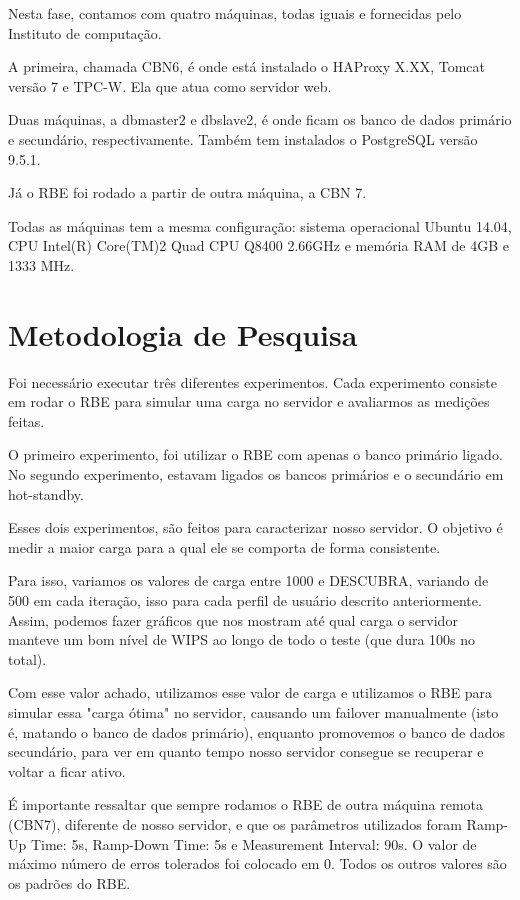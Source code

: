 \documentclass[11pt,twoside]{article}
\begin{document}
     Nesta fase, contamos com quatro máquinas, todas iguais e fornecidas pelo Instituto de computação.

     A primeira, chamada CBN6, é onde está instalado o HAProxy X.XX, Tomcat versão 7 e TPC-W. Ela que atua como servidor web.

     Duas máquinas, a dbmaster2 e dbslave2, é onde ficam os banco de dados primário e secundário, respectivamente. Também tem instalados o PostgreSQL vers\~ao 9.5.1.

     Já o RBE foi rodado a partir de outra máquina, a CBN 7.

     Todas as máquinas tem a mesma configuração: sistema operacional Ubuntu 14.04, CPU Intel(R) Core(TM)2 Quad CPU Q8400 2.66GHz e mem\'oria RAM de 4GB e 1333 MHz.

\section{Metodologia de Pesquisa}
\setlength{\parindent}{4ex}
Foi necessário executar três diferentes experimentos. Cada experimento consiste em rodar o RBE para simular uma carga no servidor e avaliarmos as medições feitas.

O primeiro experimento, foi utilizar o RBE com apenas o banco primário ligado. No segundo experimento, estavam ligados os bancos primários e o secundário em hot-standby.

Esses dois experimentos, são feitos para caracterizar nosso servidor. O objetivo é medir a maior carga para a qual ele se comporta de forma consistente.

Para isso, variamos os valores de carga entre 1000 e DESCUBRA, variando de 500 em cada iteração, isso para cada perfil de usuário descrito anteriormente. Assim, podemos fazer gráficos que nos mostram até qual carga o servidor manteve um bom nível de WIPS ao longo de todo o teste (que dura 100s no total).

Com esse valor achado, utilizamos esse valor de carga e utilizamos o RBE para simular essa "carga ótima" no servidor, causando um failover  manualmente (isto é, matando o banco de dados primário), enquanto promovemos o banco de dados secundário, para ver em quanto tempo nosso servidor consegue se recuperar e voltar a ficar ativo.

É importante ressaltar que sempre rodamos o RBE de outra máquina remota (CBN7), diferente de nosso servidor, e que os parâmetros utilizados foram Ramp-Up Time: 5s, Ramp-Down Time: 5s e Measurement Interval: 90s. O valor de máximo número de erros tolerados foi colocado em 0. Todos os outros valores são os padrões do RBE.
\end{document}
